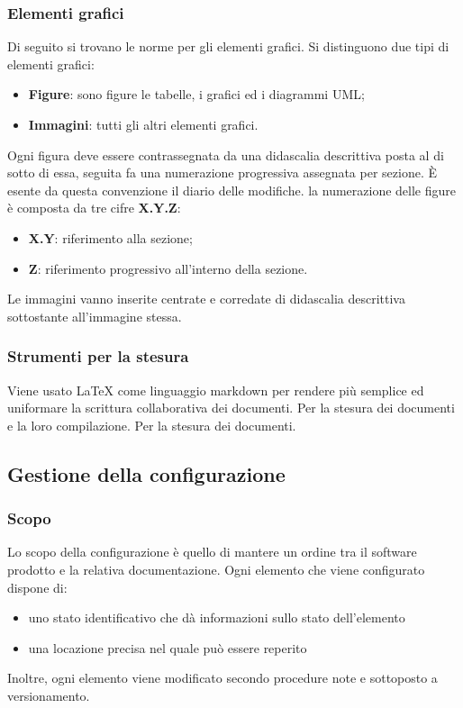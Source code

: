 	    \subsubsection{Elementi grafici}
	    Di seguito si trovano le norme per gli elementi grafici. Si distinguono due tipi di elementi grafici:
	    \begin{itemize}
	        \item \textbf{Figure}: sono figure le tabelle, i grafici ed i diagrammi UML;
	        \item \textbf{Immagini}: tutti gli altri elementi grafici. 
	    \end{itemize}
	    Ogni figura deve essere contrassegnata da una didascalia descrittiva posta al di sotto di essa, seguita fa una numerazione progressiva assegnata per sezione. È esente da questa convenzione il diario delle modifiche.
	    la numerazione delle figure è composta da tre cifre \textbf{X.Y.Z}:
	    \begin{itemize}
	        \item \textbf{X.Y}: riferimento alla sezione;
	        \item \textbf{Z}: riferimento progressivo all'interno della sezione.
	    \end{itemize}
	    Le immagini vanno inserite centrate e corredate di didascalia descrittiva sottostante all'immagine stessa.
	    \subsubsection{Strumenti per la stesura}
	    Viene usato LaTeX come linguaggio markdown per rendere più semplice ed uniformare la scrittura collaborativa dei documenti.
	    Per la stesura dei documenti e la loro compilazione.
	    Per la stesura dei documenti.
	
	\subsection{Gestione della configurazione}
		
		\subsubsection{Scopo}
		Lo scopo della configurazione è quello di mantere un ordine tra il software prodotto e la relativa documentazione. Ogni elemento che viene configurato dispone di:
			\begin{itemize}
				\item uno stato identificativo che dà informazioni sullo stato dell'elemento
				\item una locazione precisa nel quale può essere reperito
			\end{itemize}
		Inoltre, ogni elemento viene modificato secondo procedure note e sottoposto a versionamento.
		
